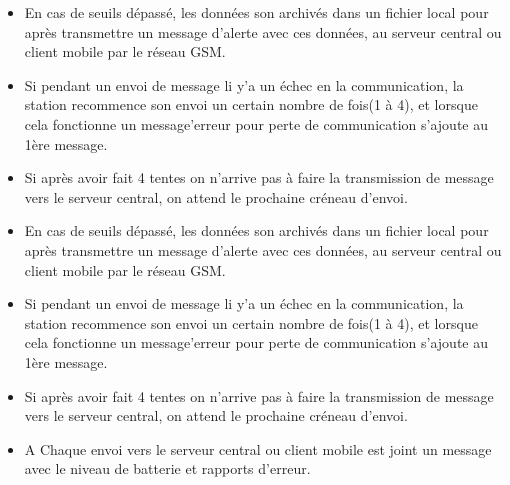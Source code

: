 \documentclass [a4paper] {report}
\begin{document}
\begin{description}
\begin{enumerate}
\begin{itemize}
		\item En cas de seuils dépassé, les données son archivés dans un fichier local pour après  transmettre
		 un message d'alerte avec ces données, au serveur central ou client mobile par le réseau GSM. \\
		\item Si pendant un envoi de message li y'a un échec en la communication, la station recommence son envoi
		 un certain nombre de fois(1 à 4), et lorsque cela fonctionne un message'erreur pour perte de communication
		  s'ajoute au 1ère message.\\
		\item Si après avoir fait 4 tentes on n'arrive pas à faire la transmission de message vers le serveur central, on
		 attend le prochaine créneau d'envoi.\\

		\item En cas de seuils dépassé, les données son archivés dans un fichier local pour après  transmettre un message d'alerte avec ces données, au serveur central ou client mobile par le réseau GSM. \\
		\item Si pendant un envoi de message li y'a un échec en la communication, la station recommence son envoi un certain nombre de fois(1 à 4), et lorsque cela fonctionne un message'erreur pour perte de communication s'ajoute au 1ère message.\\
		\item Si après avoir fait 4 tentes on n'arrive pas à faire la transmission de message vers le serveur central, on attend le prochaine créneau d'envoi.\\

		\item A Chaque envoi vers le serveur central ou client mobile est joint un message avec le niveau de batterie et rapports d'erreur.\\
		\end{itemize}\hfill\\
	\end{enumerate}


\end{description}
\end{document}
